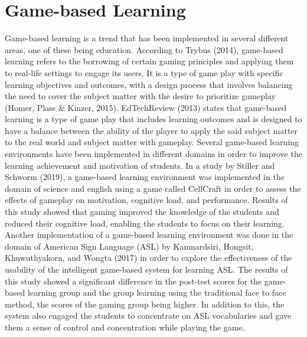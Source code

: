 \section{Game-based Learning}
Game-based learning is a trend that has been implemented in several different areas, one of these being education. According to Trybus (2014), game-based learning refers to the borrowing of certain gaming principles and applying them to real-life settings to engage its users. It is a type of game play with specific learning objectives and outcomes, with a design process that involves balancing the need to cover the subject matter with the desire to prioritize gameplay (Homer, Plass \& Kinzer, 2015). EdTechReview (2013) states that game-based learning is a type of game play that includes learning outcomes and is designed to have a balance between the ability of the player to apply the said subject matter to the real world and subject matter with gameplay.
Several game-based learning environments have been implemented in different domains in order to improve the learning achievement and motivation of students. In a study by Stiller and Schworm (2019), a game-based learning environment was implemented in the domain of science and english using a game called CellCraft in order to assess the effects of gameplay on motivation, cognitive load, and performance. Results of this study showed that gaming improved the knowledge of the students and reduced their cognitive load, enabling the students to focus on their learning. Another implementation of a game-based learning environment was done in the domain of American Sign Language (ASL) by Kamnardsiri, Hongsit, Khuwuthyakorn, and Wongta (2017) in order to explore the effectiveness of the usability of the intelligent game-based system for learning ASL. The results of this study showed a significant difference in the post-test scores for the game-based learning group and the group learning using the traditional face to face method, the scores of the gaming group being higher. In addition to this, the system also engaged the students to concentrate on ASL vocabularies and gave them a sense of control and concentration while playing the game.


















